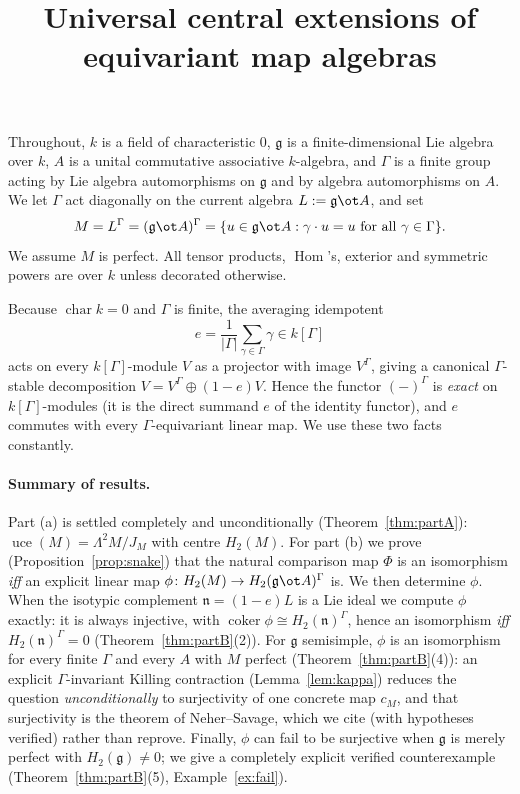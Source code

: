 \documentclass{amsart}
\theoremstyle{definition}
\DeclareMathOperator{\uce}{uce}
\DeclareMathOperator{\Hom}{Hom}
\newcommand{\g}{\mathfrak{g}}
\newcommand{\nn}{\mathfrak{n}}
\newcommand{\Gm}{\Gamma}
\begin{document}
\title{Universal central extensions of equivariant map algebras}
\maketitle

Throughout, $k$ is a field of characteristic $0$, $\g$ is a finite-dimensional
Lie algebra over $k$, $A$ is a unital commutative associative $k$-algebra, and
$\Gm$ is a finite group acting by Lie algebra automorphisms on $\g$ and by algebra
automorphisms on $A$. We let $\Gm$ act diagonally on the current algebra
$L:=\g\ot A$, and set
\[
   M=L^{\Gm}=(\g\ot A)^{\Gm}=\{u\in\g\ot A:\gamma\cdot u=u\ \text{for all }\gamma\in\Gm\}.
\]
We assume $M$ is perfect.  All tensor products, $\Hom$'s, exterior and symmetric
powers are over $k$ unless decorated otherwise.

Because $\operatorname{char}k=0$ and $\Gm$ is finite, the averaging idempotent
\[
   e=\frac{1}{|\Gm|}\sum_{\gamma\in\Gm}\gamma\in k[\Gm]
\]
acts on every $k[\Gm]$-module $V$ as a projector with image $V^{\Gm}$, giving a
canonical $\Gm$-stable decomposition $V=V^{\Gm}\oplus(1-e)V$.  Hence the functor
$(-)^{\Gm}$ is \emph{exact} on $k[\Gm]$-modules (it is the direct summand $e$ of
the identity functor), and $e$ commutes with every $\Gm$-equivariant linear map.
We use these two facts constantly.

\paragraph{Summary of results.}  Part (a) is settled completely and unconditionally
(Theorem~\ref{thm:partA}): $\uce(M)=\Lambda^2M/J_M$ with centre $H_2(M)$.  For part
(b) we prove (Proposition~\ref{prop:snake}) that the natural comparison map $\Phi$
is an isomorphism \emph{iff} an explicit linear map
$\phi\colon H_2(M)\to H_2(\g\ot A)^{\Gm}$ is.  We then determine $\phi$.  When the
isotypic complement $\nn=(1-e)L$ is a Lie ideal we compute $\phi$ exactly: it is
always injective, with $\operatorname{coker}\phi\cong H_2(\nn)^{\Gm}$, hence an
isomorphism \emph{iff} $H_2(\nn)^{\Gm}=0$ (Theorem~\ref{thm:partB}(2)).  For $\g$
semisimple, $\phi$ is an isomorphism for every finite $\Gm$ and every $A$ with $M$
perfect (Theorem~\ref{thm:partB}(4)): an explicit $\Gm$-invariant Killing
contraction (Lemma~\ref{lem:kappa}) reduces the question \emph{unconditionally} to
surjectivity of one concrete map $c_M$, and that surjectivity is the theorem of
Neher--Savage, which we cite (with hypotheses verified) rather than reprove.  Finally,
$\phi$ can fail to be surjective when $\g$ is merely perfect with $H_2(\g)\ne0$;
we give a completely explicit verified counterexample (Theorem~\ref{thm:partB}(5),
Example~\ref{ex:fail}).
\end{document}
